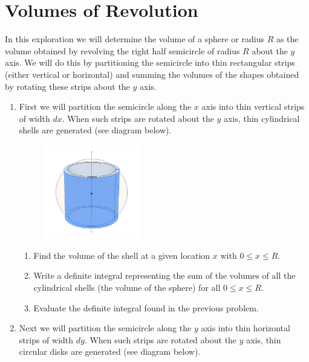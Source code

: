 \documentclass[12pt,letterpaper,fleqn]{article}
\begin{document}
\section*{Volumes of Revolution}

In this exploration we will determine the volume of a sphere or radius $R$ as the volume obtained by revolving the right half semicircle of radius $R$ about the $y$ axis. We will do this by partitioning the semicircle into thin rectangular strips (either vertical or horizontal) and summing the volumes of the shapes obtained by rotating these strips about the $y$ axis.
\begin{enumerate}
 \item First we will partition the semicircle along the $x$ axis into thin vertical strips of width $dx$. When such strips are rotated about the $y$ axis, thin cylindrical shells are generated (see diagram below).
       \begin{figure}[!htb]
        \includegraphics[width=0.4\textwidth]{img/spehre_vol_by_shells.png}
       \end{figure}
       \begin{enumerate}
        \item Find the volume of the shell at a given location $x$ with $0 \leq x \leq R$.
        \item Write a definite integral representing the sum of the volumes of all the cylindrical shells (the volume of the sphere) for all $0 \leq x \leq R$.
        \item Evaluate the definite integral found in the previous problem.
       \end{enumerate}
       \newpage
 \item Next we will partition the semicircle along the $y$ axis into thin horizontal strips of width $dy$. When such strips are rotated about the $y$ axis, thin circular disks are generated (see diagram below).
       \begin{figure}[!htb]

\end{figure}
\end{enumerate}
\end{document}
